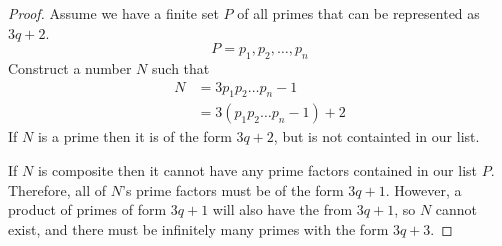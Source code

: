 \documentclass[12pt,a4paper,reqno,parskip=full]{amsart}
\numberwithin{equation}{section}
\theoremstyle{plain}
\theoremstyle{definition}
\begin{document}
\begin{enumerate}
\begin{proof}
          Assume we have a finite set $P$ of all primes that can be represented as $3q + 2$.
          \[P = {p_1, p_2, \dots, p_n}\]
          Construct a number $N$ such that
          \begin{align*}
            N & = 3p_1p_2 \dots p_n - 1 \\
              & = 3(p_1p_2 \dots p_n - 1) + 2
          \end{align*}
          If $N$ is a prime then it is of the form $3q + 2$, but is not containted in our list.
          
          If $N$ is composite then it cannot have any prime factors contained in our list $P$.
          Therefore, all of $N$'s prime factors must be of the form $3q + 1$. However, a product of
          primes of form $3q + 1$ will also have the from $3q + 1$, so $N$ cannot exist, and there
          must be infinitely many primes with the form $3q + 3$.
        \end{proof}
\end{enumerate}
\end{document}
